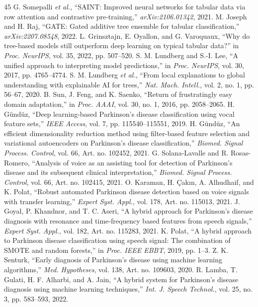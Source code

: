 \documentclass[journal,10pt,twoside]{IEEEtran}
\begin{document}
\begin{thebibliography}{45}
 G. Somepalli \textit{et al.}, ``SAINT: Improved neural networks for tabular data via row attention and contrastive pre-training,'' \textit{arXiv:2106.01342}, 2021.
 M. Joseph and H. Raj, ``GATE: Gated additive tree ensemble for tabular classification,'' \textit{arXiv:2207.08548}, 2022.
 L. Grinsztajn, E. Oyallon, and G. Varoquaux, ``Why do tree-based models still outperform deep learning on typical tabular data?'' in \textit{Proc. NeurIPS}, vol. 35, 2022, pp. 507--520.
 S. M. Lundberg and S.-I. Lee, ``A unified approach to interpreting model predictions,'' in \textit{Proc. NeurIPS}, vol. 30, 2017, pp. 4765--4774.
 S. M. Lundberg \textit{et al.}, ``From local explanations to global understanding with explainable AI for trees,'' \textit{Nat. Mach. Intell.}, vol. 2, no. 1, pp. 56--67, 2020.
 B. Sun, J. Feng, and K. Saenko, ``Return of frustratingly easy domain adaptation,'' in \textit{Proc. AAAI}, vol. 30, no. 1, 2016, pp. 2058--2065.
 H. G\"{u}nd\"{u}z, ``Deep learning-based Parkinson's disease classification using vocal feature sets,'' \textit{IEEE Access}, vol. 7, pp. 115540--115551, 2019.
 H. G\"{u}nd\"{u}z, ``An efficient dimensionality reduction method using filter-based feature selection and variational autoencoders on Parkinson's disease classification,'' \textit{Biomed. Signal Process. Control}, vol. 66, Art. no. 102452, 2021.
 G. Solana-Lavalle and R. Rosas-Romero, ``Analysis of voice as an assisting tool for detection of Parkinson's disease and its subsequent clinical interpretation,'' \textit{Biomed. Signal Process. Control}, vol. 66, Art. no. 102415, 2021.
 O. Karaman, H. \c{C}ak{\i}n, A. Alhudhaif, and K. Polat, ``Robust automated Parkinson disease detection based on voice signals with transfer learning,'' \textit{Expert Syst. Appl.}, vol. 178, Art. no. 115013, 2021.
 J. Goyal, P. Khandnor, and T. C. Aseri, ``A hybrid approach for Parkinson's disease diagnosis with resonance and time-frequency based features from speech signals,'' \textit{Expert Syst. Appl.}, vol. 182, Art. no. 115283, 2021.
 K. Polat, ``A hybrid approach to Parkinson disease classification using speech signal: The combination of SMOTE and random forests,'' in \textit{Proc. IEEE EBBT}, 2019, pp. 1--3.
 Z. K. Senturk, ``Early diagnosis of Parkinson's disease using machine learning algorithms,'' \textit{Med. Hypotheses}, vol. 138, Art. no. 109603, 2020.
 R. Lamba, T. Gulati, H. F. Alharbi, and A. Jain, ``A hybrid system for Parkinson's disease diagnosis using machine learning techniques,'' \textit{Int. J. Speech Technol.}, vol. 25, no. 3, pp. 583--593, 2022.

\end{thebibliography}
\end{document}
